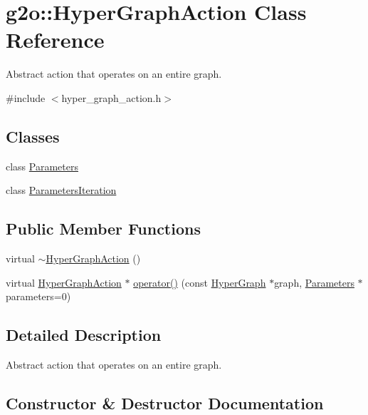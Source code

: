 \hypertarget{classg2o_1_1_hyper_graph_action}{}\section{g2o\+:\+:Hyper\+Graph\+Action Class Reference}
\label{classg2o_1_1_hyper_graph_action}


Abstract action that operates on an entire graph.  




{\ttfamily \#include $<$hyper\+\_\+graph\+\_\+action.\+h$>$}

\subsection*{Classes}
\begin{DoxyCompactItemize}
\item 
class \mbox{\hyperlink{classg2o_1_1_hyper_graph_action_1_1_parameters}{Parameters}}
\item 
class \mbox{\hyperlink{classg2o_1_1_hyper_graph_action_1_1_parameters_iteration}{Parameters\+Iteration}}
\end{DoxyCompactItemize}
\subsection*{Public Member Functions}
\begin{DoxyCompactItemize}
\item 
virtual \mbox{\hyperlink{classg2o_1_1_hyper_graph_action_a49de9295ace027074f459714ca257b15}{$\sim$\+Hyper\+Graph\+Action}} ()
\item 
virtual \mbox{\hyperlink{classg2o_1_1_hyper_graph_action}{Hyper\+Graph\+Action}} $\ast$ \mbox{\hyperlink{classg2o_1_1_hyper_graph_action_aea392eafa65ab432a3c4d1dabde9bdbe}{operator()}} (const \mbox{\hyperlink{classg2o_1_1_hyper_graph}{Hyper\+Graph}} $\ast$graph, \mbox{\hyperlink{classg2o_1_1_hyper_graph_action_1_1_parameters}{Parameters}} $\ast$parameters=0)
\end{DoxyCompactItemize}


\subsection{Detailed Description}
Abstract action that operates on an entire graph. 

\subsection{Constructor \& Destructor Documentation}
\mbox{\label{classg2o_1_1_hyper_graph_action_a49de9295ace027074f459714ca257b15}} 
